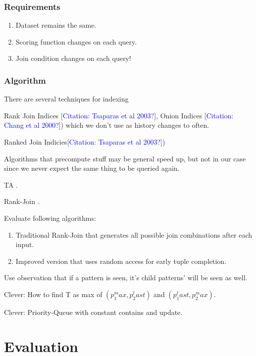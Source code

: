 \documentclass[m,bachelor,binding,palatino]{WeSTthesis}
\newcommand{\mbref}[1]{\textcolor{blue}{\footnotesize[Citation: #1?]}}
\begin{document}
\subsection{Requirements}

\begin{enumerate}
  \item Dataset remains the same.
  \item Scoring function changes on each query.
  \item Join condition changes on each query!
\end{enumerate}

\subsection{Algorithm}

There are several techniques for indexing {Rank Join Indices \mbref{Tsaparas et
al 2003}, Onion Indices \mbref{Chang et al 2000}) which we don't use as history
changes to often.

Ranked Join Indicies\mbref{Tsaparas et al 2003})

Algorithms that precompute stuff may be general speed up, but not in our case
since we never expect the same thing to be queried again.

TA \parencite{Fagin2001}.

Rank-Join \parencite{Ilyas2004}.

Evaluate following algorithms:

\begin{enumerate}
  \item Traditional Rank-Join that generates all possible join combinations
    after each input.
  \item Improved version that uses random access for early tuple completion.
\end{enumerate}

Use observation that if a pattern is seen, it's child patterns' will be seen as
well.

Clever: How to find T as max of $(p_1^max, p_2^last)$ and $(p_1^last, p_2^max)$.

Clever: Priority-Queue with constant contains and update.

\chapter{Evaluation}

}
\end{document}

